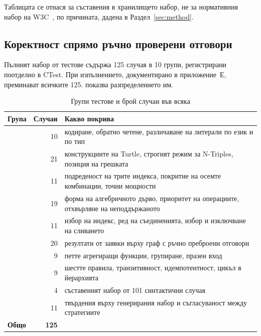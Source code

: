 Таблицата се отнася за съставения в хранилището набор, не за нормативния набор на
W3C~\cite{w3c_sparql11_testsuite}, по причината, дадена в Раздел~\ref{sec:method}.

\subsection{Коректност спрямо ръчно проверени отговори}

Пълният набор от тестове съдържа 125 случая в 10 групи, регистрирани поотделно в CTest.
При изпълнението, документирано в приложение~Е, преминават всичките 125.
 показва разпределението им.

\begin{table}[H]
\caption{Групи тестове и брой случаи във всяка}
\label{tab:testgroups}
\centering
\fontsize{10}{12}\selectfont
\begin{tabular}{@{}L{3.2cm}rL{7.6cm}@{}}
\toprule
\textbf{Група} & \textbf{Случаи} & \textbf{Какво покрива} \\
\midrule
{}    & 10 & кодиране, обратно четене, различаване на литерали по език и по тип \\
        & 21 & конструкциите на Turtle, строгият режим за N-Triples, позиция на грешката \\
         & 11 & подреденост на трите индекса, покритие на осемте комбинации, точни мощности \\
 & 19 & форма на алгебричното дърво, приоритет на операциите, отхвърляне на неподдържаното \\
       & 11 & избор на индекс, ред на съединенията, избор и изключване на сливането \\
          & 20 & резултати от заявки върху граф с ръчно преброени отговори \\
     &  9 & петте агрегиращи функции, групиране, празен вход \\
          &  9 & шестте правила, транзитивност, идемпотентност, цикъл в йерархията \\
  &  4 & съставеният набор от 101 синтактични случая \\
  & 11 & твърдения върху генерирания набор и съгласуваност между стратегиите \\
\midrule
\textbf{Общо} & \textbf{125} & \\
\bottomrule
\end{tabular}
\end{table}


